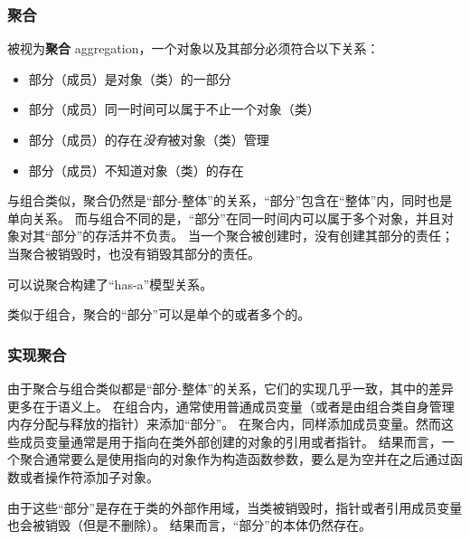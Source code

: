 \documentclass[../../LearnCpp.tex]{subfiles}
\begin{document}

\subsubsection*{聚合}

被视为\textbf{聚合} aggregation，一个对象以及其部分必须符合以下关系：

\begin{itemize}
  \item 部分（成员）是对象（类）的一部分
  \item 部分（成员）同一时间可以属于不止一个对象（类）
  \item 部分（成员）的存在\textit{没有}被对象（类）管理
  \item 部分（成员）不知道对象（类）的存在
\end{itemize}

与组合类似，聚合仍然是“部分-整体”的关系，“部分”包含在“整体”内，同时也是单向关系。
而与组合不同的是，“部分”在同一时间内可以属于多个对象，并且对象对其“部分”的存活并不负责。
当一个聚合被创建时，没有创建其部分的责任；当聚合被销毁时，也没有销毁其部分的责任。

可以说聚合构建了“has-a”模型关系。

类似于组合，聚合的“部分”可以是单个的或者多个的。

\subsubsection*{实现聚合}

由于聚合与组合类似都是“部分-整体”的关系，它们的实现几乎一致，其中的差异更多在于语义上。
在组合内，通常使用普通成员变量（或者是由组合类自身管理内存分配与释放的指针）来添加“部分”。
在聚合内，同样添加成员变量。然而这些成员变量通常是用于指向在类外部创建的对象的引用或者指针。
结果而言，一个聚合通常要么是使用指向的对象作为构造函数参数，要么是为空并在之后通过函数或者操作符添加子对象。

由于这些“部分”是存在于类的外部作用域，当类被销毁时，指针或者引用成员变量也会被销毁（但是不删除）。
结果而言，“部分”的本体仍然存在。
\end{document}
